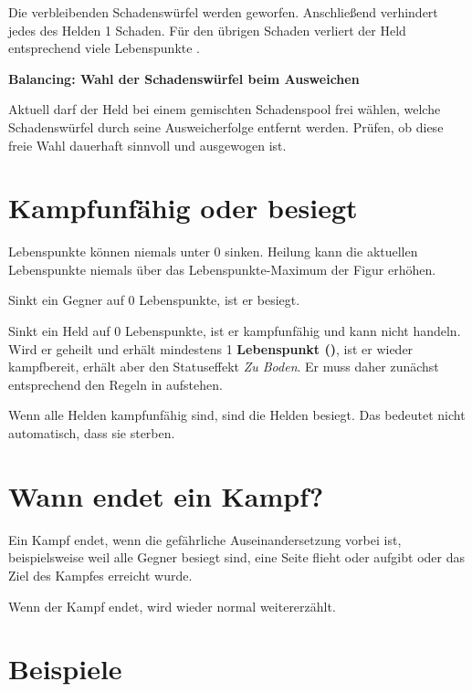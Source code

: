 Die verbleibenden Schadenswürfel werden geworfen. Anschließend verhindert jedes \armor{} des Helden 1 Schaden. Für den übrigen Schaden verliert der Held entsprechend viele Lebenspunkte \lifeLoss.

\begin{todo}
\textbf{Balancing: Wahl der Schadenswürfel beim Ausweichen}

Aktuell darf der Held bei einem gemischten Schadenspool frei wählen, welche Schadenswürfel durch seine Ausweicherfolge entfernt werden. Prüfen, ob diese freie Wahl dauerhaft sinnvoll und ausgewogen ist.
\end{todo}

\section{Kampfunfähig oder besiegt}

Lebenspunkte können niemals unter 0 sinken. Heilung kann die aktuellen Lebenspunkte niemals über das Lebenspunkte-Maximum der Figur erhöhen.

Sinkt ein Gegner auf 0 Lebenspunkte, ist er besiegt.

Sinkt ein Held auf 0 Lebenspunkte, ist er kampfunfähig und kann nicht handeln. Wird er geheilt und erhält mindestens 1 \textbf{Lebenspunkt (\lifeGain)}, ist er wieder kampfbereit, erhält aber den Statuseffekt \emph{Zu Boden}. Er muss daher zunächst entsprechend den Regeln in  aufstehen.

Wenn alle Helden kampfunfähig sind, sind die Helden besiegt. Das bedeutet nicht automatisch, dass sie sterben.

\section{Wann endet ein Kampf?}

Ein Kampf endet, wenn die gefährliche Auseinandersetzung vorbei ist, beispielsweise weil alle Gegner besiegt sind, eine Seite flieht oder aufgibt oder das Ziel des Kampfes erreicht wurde.

Wenn der Kampf endet, wird wieder normal weitererzählt.

\section{Beispiele}


